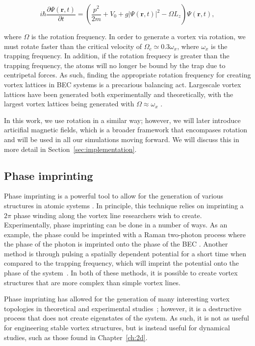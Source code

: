 \begin{equation}
i \hbar \frac{\partial \Psi(\mathbf{r},t)}{\partial t} = \left(\frac{p^2}{2m} + V_0 + g |\Psi(\mathbf{r},t)|^2 -\Omega L_z \right)\Psi(\mathbf{r},t),
\end{equation}

\noindent where $\Omega$ is the rotation frequency. 
In order to generate a vortex via rotation, we must rotate faster than the critical velocity of $\Omega_c \simeq 0.3 \omega_x$, where $\omega_x$ is the trapping frequency.
In addition, if the rotation frequecy is greater than the trapping frequency, the atoms will no longer be bound by the trap due to centripetal forces.
As such, finding the appropriate rotation frequency for creating vortex lattices in BEC systems is a precarious balancing act.
Largescale vortex lattices have been generated both experimentally and theoretically, with the largest vortex lattices being generated with $\Omega \approx \omega_x$ \cite{o2016, o2016topo, abo2001, Schweikhard2004}.

In this work, we use rotation in a similar way; however, we will later introduce articifial magnetic fields, which is a broader framework that encompases rotation and will be used in all our simulations moving forward.
We will discuss this in more detail in Section~\ref{sec:implementation}.

\subsection{Phase imprinting}

Phase imprinting is a powerful tool to allow for the generation of various structures in atomic systems \cite{kumar2018, moulder2012, burger1999, denschlag2000}.
In principle, this technique relies on imprinting a $2\pi$ phase winding along the vortex line researchers wish to create.
Experimentally, phase imprinting can be done in a number of ways.
As an example, the phase could be imprinted with a Raman two-photon process where the phase of the photon is imprinted onto the phase of the BEC \cite{moulder2012, kasevich1991, ryu2007}.
Another method is through pulsing a spatially dependent potential for a short time when compared to the trapping frequency, which will imprint the potential onto the phase of the system~\cite{kasevich1991}.
In both of these methods, it is possible to create vortex structures that are more complex than simple vortex lines.

Phase imprinting has allowed for the generation of many interesting vortex topologies in theoretical and experimental studies~\cite{white2014, maucher2016}; however, it is a destructive process that does not create eigenstates of the system.
As such, it is not as useful for engineering stable vortex structures, but is instead useful for dynamical studies, such as those found in Chapter~\ref{ch:2d}.

